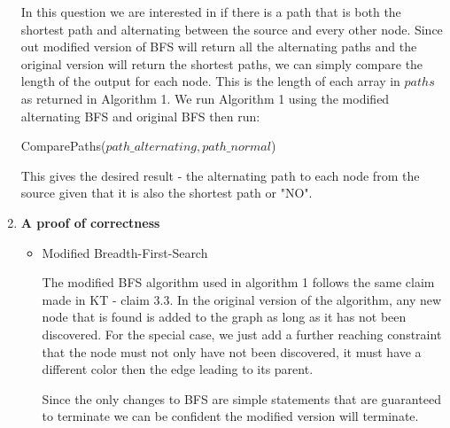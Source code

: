 \documentclass[letterpaper,11pt]{article}
\begin{document}
\begin{enumerate}
        In this question we are interested in if there is a path that is both 
        the shortest path and alternating between the source and every other
        node. Since out modified version of BFS will return all the alternating 
        paths and the original version will return the shortest paths, we can 
        simply compare the length of the output for each node. This is the 
        length of each array in $paths$ as returned in Algorithm 1. We run 
        Algorithm 1 using the modified alternating BFS and original BFS then 
        run:

        \begin{algorithm}[H]
            \caption{ComparePaths($path\_alternating, path\_normal$)} 
        \end{algorithm}

        This gives the desired result - the alternating path to each node from 
        the source given that it is also the shortest path or "NO".

    \item \textbf{A proof of correctness}
        \begin{itemize}
            \item Modified Breadth-First-Search 

                The modified BFS algorithm used in algorithm 1 follows the same 
                claim made in KT - claim 3.3. In the original version of the 
                algorithm, any new node that is found is added to the graph as 
                long as it has not been discovered. For the special case, we 
                just add a further reaching constraint that the node must not 
                only have not been discovered, it must have a different color 
                then the edge leading to its parent.

                Since the only changes to BFS are simple statements that are
                guaranteed to terminate we can be confident the modified 
                version will terminate.


\end{itemize}
\end{enumerate}
\end{document}
